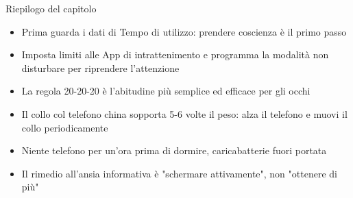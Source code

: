 \begin{tcbsummary}{Riepilogo del capitolo}
\begin{itemize}
  \item Prima guarda i dati di Tempo di utilizzo: prendere coscienza è il primo passo
  \item Imposta limiti alle App di intrattenimento e programma la modalità non disturbare per riprendere l'attenzione
  \item La regola 20-20-20 è l'abitudine più semplice ed efficace per gli occhi
  \item Il collo col telefono china sopporta 5-6 volte il peso: alza il telefono e muovi il collo periodicamente
  \item Niente telefono per un'ora prima di dormire, caricabatterie fuori portata
  \item Il rimedio all'ansia informativa è "schermare attivamente", non "ottenere di più"
\end{itemize}

\end{tcbsummary}
